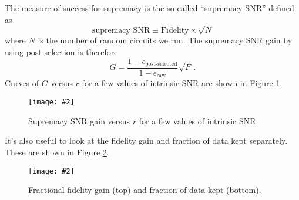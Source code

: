 \documentclass{article}
\DeclareRobustCommand{\quickfig}[4]{
  \begin{figure}
    \begin{centering}
      \texttt{[image: \#2]}
      \par
    \end{centering}
    \caption{#3}
    \label{#4}
  \end{figure}
}
\begin{document}
The measure of success for supremacy is the so-called ``supremacy SNR'' defined as
\begin{equation}
  \text{supremacy SNR} \equiv \text{Fidelity} \times \sqrt{N}
\end{equation}
where $N$ is the number of random circuits we run.
The supremacy SNR gain by using post-selection is therefore
\begin{equation}
  G = \frac{1 - \epsilon_\text{post-selected}}{1 - \epsilon_\text{raw}} \sqrt{F} \, .
\end{equation}
Curves of $G$ versus $r$ for a few values of intrinsic SNR are shown in Figure \ref{fig:G}.

\quickfig{0.9\columnwidth}{snr_gain.pdf}{Supremacy SNR gain versus $r$ for a few values of intrinsic SNR}{fig:G}

It's also useful to look at the fidelity gain and fraction of data kept separately.
These are shown in Figure \ref{fig:compare}.

\quickfig{0.8\columnwidth}{compare.pdf}{Fractional fidelity gain (top) and fraction of data kept (bottom).}{fig:compare}
\end{document}
